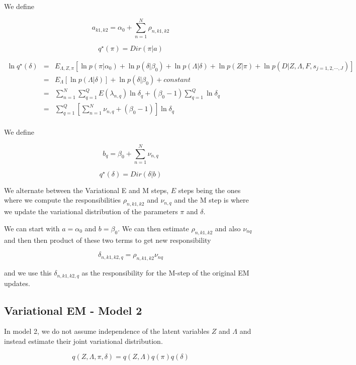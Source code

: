 \documentclass[12pt]{article}
\begin{document}
We define 

$$ a_{k1,k2} = \alpha_0 + \sum_{n=1}^{N} \rho_{n,k1,k2} $$

$$ q^{\star} (\pi) = Dir(\pi | a)  $$


\begin{eqnarray} \nonumber
\ln q^{\star} (\delta) & = & E_{\Lambda, Z, \pi} \left [ \ln p(\pi|\alpha_0)+ \ln p(\delta | \beta_0) + \ln p(\Lambda | \delta) + \ln p(Z | \pi) + \ln p(D | Z, \Lambda, F, s_{j=1,2,\cdots,J}) \right ] \\  \nonumber
  & = & E_{\Lambda} \left [ \ln p(\Lambda | \delta) \right] + \ln p(\delta | \beta_0) + constant \\ \nonumber
  & = & \sum_{n=1}^{N}\sum_{q=1}^{Q} E(\lambda_{n,q}) \ln \delta_{q} + (\beta_0 -1) \sum_{q=1}^{Q} \ln \delta_{q} \\ \nonumber
  & = & \sum_{q=1}^{Q} \left [ \sum_{n=1}^{N} \nu_{n,q} + (\beta_0 -1) \right] \ln \delta_{q} \\ \nonumber
\end{eqnarray}

We define 

$$ b_{q} = \beta_0 + \sum_{n=1}^{N} \nu_{n,q} $$

$$ q^{\star} (\delta) = Dir(\delta | b)  $$


We alternate between the Variational E and M steps, $E$ steps being the ones where we compute the responsibilities $\rho_{n,k1,k2}$ and $\nu_{n,q}$ and the M step is where we update the variational distribution of the parameters $\pi$ and $\delta$. 

We can start with $a= \alpha_0$ and $b=\beta_0$. We can then estimate $\rho_{n,k1,k2}$ and also $\nu_{nq}$ and then then product of these two terms to get new responsibility

$$ \delta_{n, k1, k2, q} = \rho_{n, k1, k2} \nu_{nq} $$

and we use this $\delta_{n, k1, k2, q}$ as the responsibility for the M-step of the original EM updates. 

\subsection{Variational EM  - Model 2}

In model 2, we do not assume independence of the latent variables $Z$ and $\Lambda$ and instead estimate their joint variational distribution. 

$$ q(Z, \Lambda, \pi, \delta) = q(Z, \Lambda) q(\pi) q(\delta) $$
\end{document}
